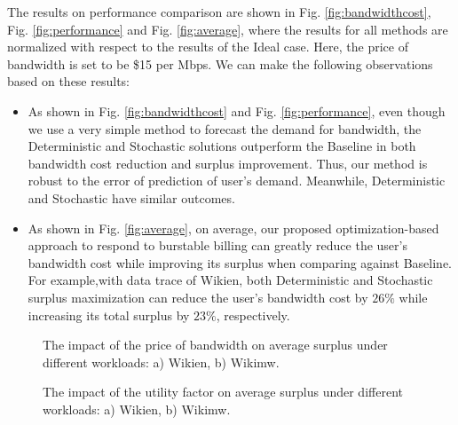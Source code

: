 \documentclass[10pt,journal,compsoc]{IEEEtran}
\begin{document}
The results on performance comparison are shown in Fig. \ref{fig:bandwidthcost}, Fig. \ref{fig:performance} and Fig. \ref{fig:average}, where the results for all methods are normalized with respect to the results of the Ideal case. Here, the price of bandwidth is set to be  \$15 per Mbps. We can make the following observations based on these results:
\begin{itemize}

  \item As shown in Fig. \ref{fig:bandwidthcost} and Fig. \ref{fig:performance}, even though we use a very simple method to forecast the demand for bandwidth, the Deterministic and Stochastic solutions outperform the Baseline in both bandwidth cost reduction and surplus improvement. Thus, our method is robust to the error of prediction of user's demand. Meanwhile, Deterministic and Stochastic have similar outcomes. 
      \vspace{0.05cm}

 \item As shown in Fig. \ref{fig:average}, on average, our proposed optimization-based approach to respond to burstable billing can greatly reduce the user's bandwidth cost while improving its surplus when comparing against Baseline. For example,with data trace of Wikien, both Deterministic and Stochastic surplus maximization can reduce the user's bandwidth cost by $26\%$ while increasing its total surplus by $23\%$, respectively.
\end{itemize}

      \vspace{0.05cm}
\begin{figure}[!t]
\centering
{}
\caption{The impact of the price of bandwidth on average surplus under different workloads: a) Wikien, b) Wikimw.}\label{fig:impactprice}
\end{figure}
\begin{figure}[!t]
\centering
{}
\caption{The impact of the utility factor on average surplus under different workloads: a) Wikien, b) Wikimw.}\label{fig:impactA}
\end{figure}
\end{document}
